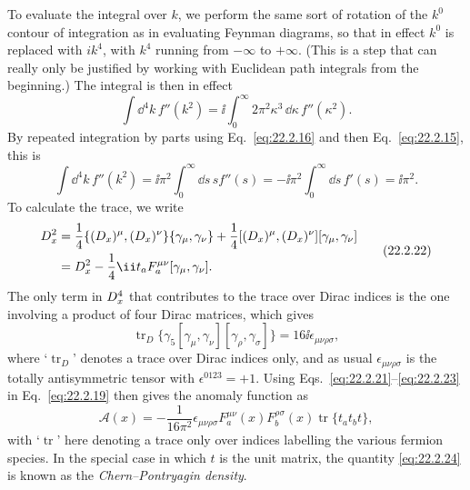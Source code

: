 To evaluate the integral over $k$, we perform the same sort of rotation of
the $k^0$ contour of integration as in evaluating Feynman diagrams, so that
in effect $k^0$ is replaced with $ik^4$, with $k^4$ running from $-\infty$
to $+\infty$. (This is a step that can really only be justified by working
with Euclidean path integrals from the beginning.) The integral is then in
effect
\begin{equation}
 \int \dd^4k\,f''(k^2)
 =\ii\int_0^\infty 2\pi^2\kappa^3\,\dd\kappa\,f''(\kappa^2).
 \tag{22.2.20}\label{eq:22.2.20}
\end{equation}
By repeated integration by parts using Eq.~\eqref{eq:22.2.16} and then
Eq.~\eqref{eq:22.2.15}, this is
\begin{equation}
 \int \dd^4k\,f''(k^2)
 =\ii\pi^2\int_0^\infty \dd s\,s f''(s)
 =-\ii\pi^2\int_0^\infty \dd s\,f'(s)
 =\ii\pi^2.
 \tag{22.2.21}\label{eq:22.2.21}
\end{equation}
To calculate the trace, we write
\begin{equation}
 \begin{aligned}
 \sl{D}_x^2
 &=\frac14\{(D_x)^\mu,(D_x)^\nu\}\{\gamma_\mu,\gamma_\nu\}
 +\frac14[(D_x)^\mu,(D_x)^\nu][\gamma_\mu,\gamma_\nu]\\
 &=D_x^2-\frac14\ii t_a F_a^{\mu\nu}
 [\gamma_\mu,\gamma_\nu].
 \end{aligned}
 \tag{22.2.22}\label{eq:22.2.22}
\end{equation}
The only term in $\sl{D}_x^4$ that contributes to the trace over Dirac
indices is the one involving a product of four Dirac matrices, which gives
\begin{equation}
 \operatorname{tr}_{D}\{\gamma_5
 [\gamma_\mu,\gamma_\nu][\gamma_\rho,\gamma_\sigma]\}
 =16\ii\epsilon_{\mu\nu\rho\sigma},
 \tag{22.2.23}\label{eq:22.2.23}
\end{equation}
where `$\operatorname{tr}_{D}$' denotes a trace over Dirac indices only,
and as usual $\epsilon_{\mu\nu\rho\sigma}$ is the totally antisymmetric
tensor with $\epsilon^{0123}=+1$. Using
Eqs.~\eqref{eq:22.2.21}--\eqref{eq:22.2.23} in Eq.~\eqref{eq:22.2.19}
then gives the anomaly function as
\begin{equation}
 \mathcal A(x)=-\frac{1}{16\pi^2}\epsilon_{\mu\nu\rho\sigma}
 F_a^{\mu\nu}(x)F_b^{\rho\sigma}(x)
 \operatorname{tr}\{t_a t_b t\},
 \tag{22.2.24}\label{eq:22.2.24}
\end{equation}
with `$\operatorname{tr}$' here denoting a trace only over indices
labelling the various fermion species. In the special case in which $t$ is
the unit matrix, the quantity \eqref{eq:22.2.24} is known as the
\emph{Chern--Pontryagin density}.

